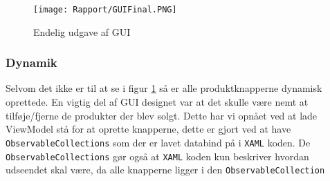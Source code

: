 \begin{figure}[H]
\centering
	\texttt{[image: Rapport/GUIFinal.PNG]}
	\caption{Endelig udgave af GUI}
	\label{fig:GUIFinal}
\end{figure}

\subsubsection{Dynamik}
Selvom det ikke er til at se i figur \ref{fig:GUIFinal} så er alle produktknapperne dynamisk oprettede. 
En vigtig del af GUI designet var at det skulle være nemt at tilføje/fjerne de produkter der blev solgt.
Dette har vi opnået ved at lade ViewModel stå for at oprette knapperne, dette er gjort ved at have \texttt{ObservableCollections} som der er lavet databind på i \texttt{XAML} koden.
De \texttt{ObservableCollections} gør også at \texttt{XAML} koden kun beskriver hvordan udseendet skal være, da alle knapperne ligger i den \texttt{ObservableCollection}
